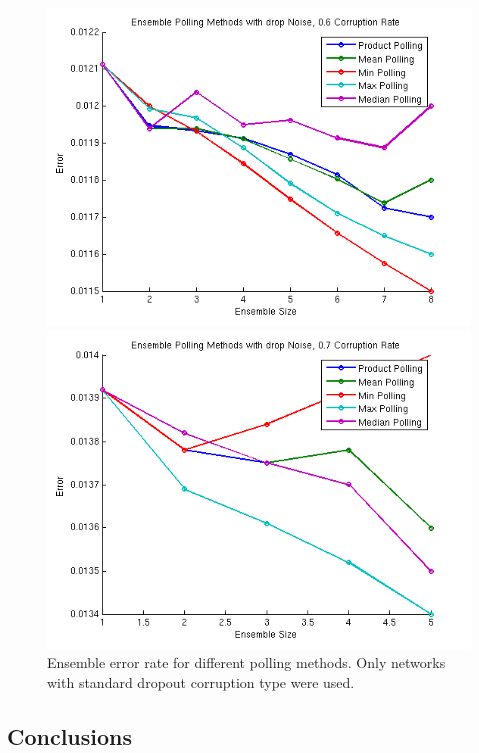 \documentclass{article} %
\begin{document}
\begin{figure}[ht]
\begin{minipage}[b]{0.5\linewidth}
    \centering
    \includegraphics[width=\linewidth]{methods6} 
    \vspace{4ex}
  \end{minipage}%
  \begin{minipage}[b]{0.5\linewidth}
    \centering
    \includegraphics[width=\linewidth]{methods5} 
    \vspace{4ex}
  \end{minipage} 
  \caption{Ensemble error rate for different polling methods. Only networks with standard dropout corruption type were used.}
\end{figure}

\subsection{Conclusions}
\end{document}

